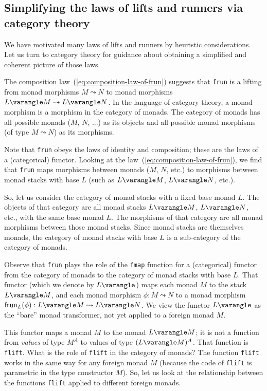 \subsection{Simplifying the laws of lifts and runners via category theory\label{subsec:Category-theoretic-properties-of-lifts-and-runners-functors-in-category-of-monads}}

We have motivated many laws of lifts and runners by heuristic considerations.
Let us turn to category theory for guidance about obtaining a simplified
and coherent picture of those laws.

The composition law~(\ref{eq:composition-law-of-frun}) suggests
that \lstinline!frun! is a lifting from monad morphisms $M\leadsto N$
to monad morphisms $L\varangle M\leadsto L\varangle N$. In the language
of category theory, a monad morphism is a morphism in the category
of monads. The category of monads has all possible monads ($M$, $N$,
...) as its objects and all possible monad morphisms (of type $M\leadsto N$)
as its morphisms. 

Note that \lstinline!frun! obeys the laws of identity and composition;
these are the laws of a (categorical) functor. Looking at the law~(\ref{eq:composition-law-of-frun}),
we find that \lstinline!frun! maps morphisms between monads ($M$,
$N$, etc.) to morphisms between monad stacks with base $L$ (such
as $L\varangle M$, $L\varangle N$, etc.). 

So, let us consider the category of monad
stacks with a fixed base monad $L$. The objects of that category
are all monad stacks $L\varangle M$, $L\varangle N$, etc., with
the same base monad $L$. The morphisms of that category are all monad
morphisms between those monad stacks. Since monad stacks are themselves
monads, the category of monad stacks with base $L$ is a sub-category
of the category of monads.

Observe that \lstinline!frun! plays the role of the \lstinline!fmap!
function for a (categorical) functor from the category of monads to
the category of monad stacks with base $L$. That functor (which we
denote by $L\varangle$) maps each monad $M$ to the stack $L\varangle M$,
and each monad morphism $\phi:M\leadsto N$ to a monad morphism $\text{frun}_{L}(\phi):L\varangle M\leadsto L\varangle N$.
We view the functor $L\varangle$ as the \textsf{``}bare\textsf{''} monad transformer,
not yet applied to a foreign monad $M$.

This functor maps a monad $M$ to the monad $L\varangle M$; it is
not a function from \emph{values} of type $M^{A}$ to values of type
$(L\varangle M)^{A}$. That function is \lstinline!flift!. What is
the role of \lstinline!flift! in the category of monads? The function
\lstinline!flift! works in the same way for any foreign monad $M$
(because the code of \lstinline!flift! is parametric in the type
constructor $M$). So, let us look at the relationship between the
functions \lstinline!flift! applied to different foreign monads.

